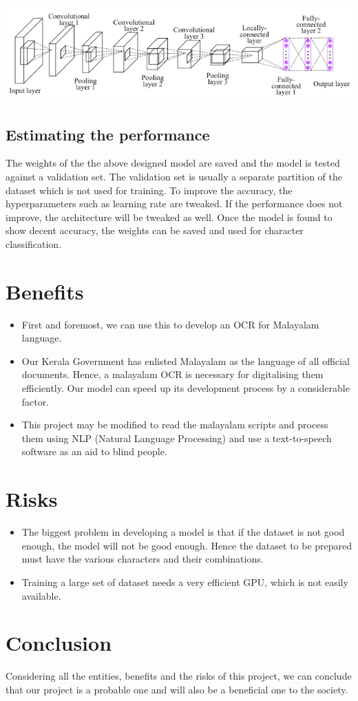 \documentclass[12pt]{report}
\begin{document}
\includegraphics[width=\textwidth]{cnn.png}

\subsection*{Estimating the performance}
The weights of the the above designed model are saved and the model is tested against a validation set. The validation set is usually a separate partition of the dataset which is not used for training. To improve the accuracy, the hyperparameters such as learning rate are tweaked. If the performance does not improve, the architecture will be tweaked as well. Once the model is found to show decent accuracy, the weights can be saved and used for character classification. 

\section*{Benefits}
\begin{itemize}
\item First and foremost, we can use this to develop an OCR for Malayalam language.


\item Our Kerala Government has enlisted Malayalam as the language of all official documents. Hence, a malayalam OCR is necessary for digitalising them efficiently. Our model can speed up its development process by a considerable factor.
\item This project may be modified to read the malayalam scripts and process them using NLP (Natural Language Processing) and use a text-to-speech software as an aid to blind people.
\end{itemize}

\section*{Risks}
\begin{itemize}
\item The biggest problem in developing a model is that if the dataset is not good enough, the model will not be good enough. Hence the dataset to be prepared must have the various characters and their combinations.
\item Training a large set of dataset needs a very efficient GPU, which is not easily available.

\end{itemize}


\section*{Conclusion}


 Considering all the entities, benefits and the risks of this project, we can conclude that our project is a probable one and will also be a beneficial one to the society.
\end{document}
